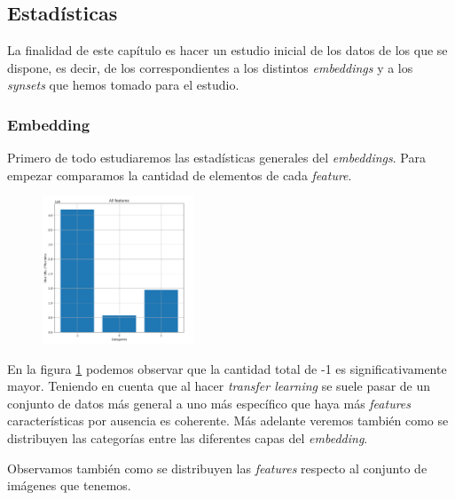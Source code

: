 \documentclass[12,twoside]{TFG-GM}
\theoremstyle{definition}
\theoremstyle{remark}
\begin{document}
\subsection{Estadísticas}\label{se:stats}
La finalidad de este capítulo es hacer un estudio inicial de los datos de los que se dispone, es decir, de los correspondientes a los distintos \textit{embeddings} y a los \textit{synsets} que hemos tomado para el estudio. 

\subsubsection{Embedding}
Primero de todo estudiaremos las estadísticas generales del \textit{embeddings}.
Para empezar comparamos la cantidad de elementos de cada \textit{feature}. 

\begin{figure}[ht] 
	\centering
	\includegraphics[width=0.4\textwidth] {Images/plots/25/quantity_of_features_bar.png}
	\caption{ 
	\label{fig:totalfeatures}}


\end{figure}

En la figura \ref{fig:totalfeatures} podemos observar que la cantidad total de -1 es significativamente mayor. Teniendo en cuenta que al hacer \textit{transfer learning} se suele pasar de un conjunto de datos más general a uno más específico que haya más \textit{features} características por ausencia es coherente. Más adelante veremos también como se distribuyen las categorías entre las diferentes capas del \textit{embedding}. 


Observamos también como se distribuyen las \textit{features} respecto al conjunto de imágenes que tenemos. 
\end{document}
